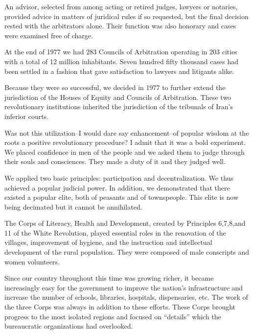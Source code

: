 An advisor, selected from among acting or retired judges, lawyers or notaries, provided advice in matters of juridical rules if so requested, but the final decision rested with the arbitrators alone. Their function was also honorary and cases were examined free of charge. 

At the end of 1977 we had 283 Councils of Arbitration operating in 203 cities with a total of 12 million inhabitants. Seven hundred fifty thousand cases had been settled in a fashion that gave satisfaction to lawyers and litigants alike. 

Because they were so successful, we decided in 1977 to further extend the jurisdiction of the Houses of Equity and Councils of Arbitration. These two revolutionary institutions inherited the jurisdiction of the tribunals of Iran's inferior courts. 

Was not this utilization--I would dare say enhancement--of popular wisdom at the roots a positive revolutionary procedure? I admit that it was a bold experiment. We placed confidence in men of the people and we asked them to judge through their souls and consciences. They made a duty of it and they judged well. 

We applied two basic principles: participation and decentralization. We thus achieved a popular judicial power. In addition, we demonstrated that there existed a popular elite, both of peasants and of townspeople. This elite is now being decimated but it cannot be annihilated. 


The Corps of Literacy, Health and Development, created by Principles 6,7,8,and 11 of the White Revolution, played essential roles in the renovation of the villages, improvement of hygiene, and the instruction and intellectual development of the rural population. They were composed of male conscripts and women volunteers. 

Since our country throughout this time was growing richer, it became increasingly easy for the government to improve the nation’s infrastructure and increase the number of schools, libraries, hospitals, dispensaries, etc. The work of the three Corps was always in addition to these efforts. These Corps brought progress to the most isolated regions and focused on “details” which the bureaucratic organizations had overlooked. 

